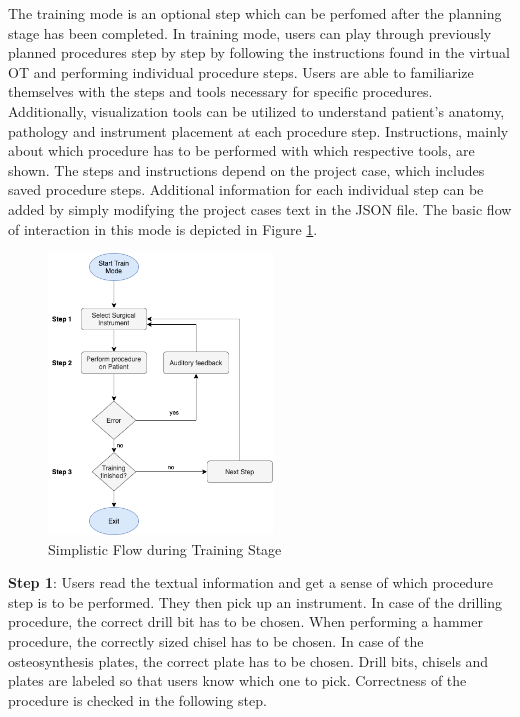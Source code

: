 The training mode is an optional step which can be perfomed after the planning stage has been completed.
In training mode, users can play through previously planned procedures step by step by following the instructions found in the virtual OT and performing individual procedure steps.
Users are able to familiarize themselves with the steps and tools necessary for specific procedures.
Additionally, visualization tools can be utilized to understand patient's anatomy, pathology and instrument placement at each procedure step.
Instructions, mainly about which procedure has to be performed with which respective tools, are shown.
The steps and instructions depend on the project case, which includes saved procedure steps.
Additional information for each individual step can be added by simply modifying the project cases text in the JSON file.
The basic flow of interaction in this mode is depicted in Figure \ref{fig::TrainingFlow}.

\begin{figure}[ht]
    \centering
    \includegraphics[width=225px]{images/implementation/features/training/training_flow.png}
    \caption{\label{fig::TrainingFlow}Simplistic Flow during Training Stage}
\end{figure}

\textbf{Step 1}: Users read the textual information and get a sense of which procedure step is to be performed.
They then pick up an instrument. In case of the drilling procedure, the correct drill bit has to be chosen.
When performing a hammer procedure, the correctly sized chisel has to be chosen.
In case of the osteosynthesis plates, the correct plate has to be chosen.
Drill bits, chisels and plates are labeled so that users know which one to pick.
Correctness of the procedure is checked in the following step.

